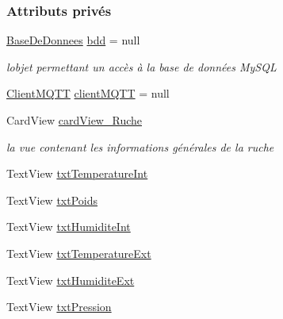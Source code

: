 \subsubsection*{Attributs privés}
\begin{DoxyCompactItemize}
\item 
\hyperlink{classfr_1_1campus_1_1laurainc_1_1honeybee_1_1_base_de_donnees}{Base\+De\+Donnees} \hyperlink{classfr_1_1campus_1_1laurainc_1_1honeybee_1_1_dashboard_activity_ac091db6a886cd65c54b8596c95b87d37}{bdd} = null
\begin{DoxyCompactList}\small\item\em l\textquotesingle{}objet permettant un accès à la base de données My\+S\+QL \end{DoxyCompactList}\item 
\hyperlink{classfr_1_1campus_1_1laurainc_1_1honeybee_1_1_client_m_q_t_t}{Client\+M\+Q\+TT} \hyperlink{classfr_1_1campus_1_1laurainc_1_1honeybee_1_1_dashboard_activity_ac72bac3feefe69341b1785a0133e1de8}{client\+M\+Q\+TT} = null
\item 
Card\+View \hyperlink{classfr_1_1campus_1_1laurainc_1_1honeybee_1_1_dashboard_activity_a2a213710fbe974be3a40fd6afecbd315}{card\+View\+\_\+\+Ruche}
\begin{DoxyCompactList}\small\item\em la vue contenant les informations générales de la ruche \end{DoxyCompactList}\item 
Text\+View \hyperlink{classfr_1_1campus_1_1laurainc_1_1honeybee_1_1_dashboard_activity_a336bd6552e6dc70bb2f9a92afd2fbdbe}{txt\+Temperature\+Int}
\item 
Text\+View \hyperlink{classfr_1_1campus_1_1laurainc_1_1honeybee_1_1_dashboard_activity_a1254223ab3507ce611d3244a43e8e14b}{txt\+Poids}
\item 
Text\+View \hyperlink{classfr_1_1campus_1_1laurainc_1_1honeybee_1_1_dashboard_activity_afb520230eefb68b38b2c12a2e57fb437}{txt\+Humidite\+Int}
\item 
Text\+View \hyperlink{classfr_1_1campus_1_1laurainc_1_1honeybee_1_1_dashboard_activity_a4a5b8ca6b359020d60e43c349c2538c3}{txt\+Temperature\+Ext}
\item 
Text\+View \hyperlink{classfr_1_1campus_1_1laurainc_1_1honeybee_1_1_dashboard_activity_a172fbb18fee80670357fe9ff8e2be62d}{txt\+Humidite\+Ext}
\item 
Text\+View \hyperlink{classfr_1_1campus_1_1laurainc_1_1honeybee_1_1_dashboard_activity_a0fc400e7bdb6580221af34a9d677e15b}{txt\+Pression}

\end{DoxyCompactItemize}
